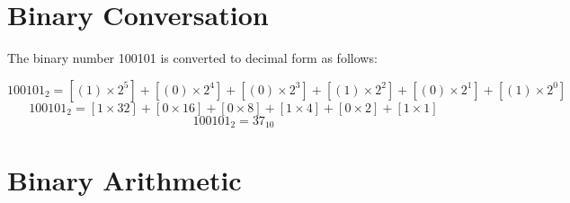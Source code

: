 \documentclass[12pt]{article}
\begin{document}
\section{Binary Conversation}
The binary number 100101 is converted to decimal form as follows:

\[
100101_2 = [ ( 1 ) \times 2^5 ] + [ ( 0 ) \times 2^4 ] + [ ( 0 ) \times 2^3 ] + [ ( 1 ) \times 2^2 ] + [ ( 0 ) \times 2^1 ] + [ ( 1 ) \times 2^0 ]  
\]
\[
100101_2 = [ 1 \times 32 ] + [ 0 \times 16 ] + [ 0 \times 8 ] + [ 1 \times 4 ] + [ 0 \times 2 ] + [ 1 \times 1 ] 
\]
\[
100101_2 = 37_{10}
\]


\newpage
\section{Binary Arithmetic}



\newpage
\end{document}
